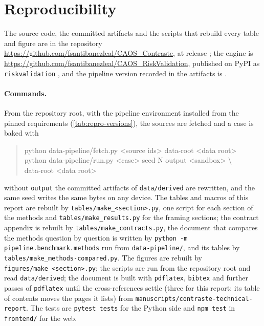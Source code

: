 \section{Reproducibility}
\label{sec:reproducibility}

The source code, the committed artifacts and the scripts that rebuild every table and figure are in the repository \url{https://github.com/fsantibanezleal/CAOS_Contraste}, at release \rsProductVersion{}; the engine is
\url{https://github.com/fsantibanezleal/CAOS_RiskValidation}, published on PyPI as \texttt{riskvalidation} \rsEngineRv{}, and the pipeline version recorded in the artifacts is \rsEnginePipeline{}\rsEnginePipelineOthers{}.

\paragraph{Commands.} From the repository root, with the pipeline environment installed from the pinned requirements (\cref{tab:repro-versions}), the sources are fetched and a case is baked with
\begin{quote}\small\ttfamily\raggedright
python data-pipeline/fetch.py <source ids> \ttdash data-root <data root>\\[2pt]
python data-pipeline/run.py <case> \ttdash seed N \ttdash output <sandbox> \textbackslash\\
\hspace*{2em}\ttdash data-root <data root>
\end{quote}
without \texttt{\ttdash output} the committed artifacts of \texttt{data/derived} are rewritten, and the same seed writes the same bytes on any device. The tables and macros of this report are rebuilt by \texttt{tables/make\_<section>.py}, one script for each section of the methods and \texttt{tables/make\_results.py} for the framing sections; the contract appendix is rebuilt by \texttt{tables/make\_contracts.py}, the document that compares the methods question by question is written by \texttt{python -m pipeline.benchmark.methods} run from \texttt{data-pipeline/}, and its tables by \texttt{tables/make\_methods-compared.py}. The figures are rebuilt by \texttt{figures/make\_<section>.py}; the scripts are run from the repository root and read \texttt{data/derived}; the document is built with \texttt{pdflatex}, \texttt{bibtex} and further passes of \texttt{pdflatex} until the cross-references settle (three for this report: its table of contents moves the pages it lists) from \texttt{manuscripts/contraste-technical-report}. The tests are \texttt{pytest tests} for the Python side and \texttt{npm test} in \texttt{frontend/} for the web.

